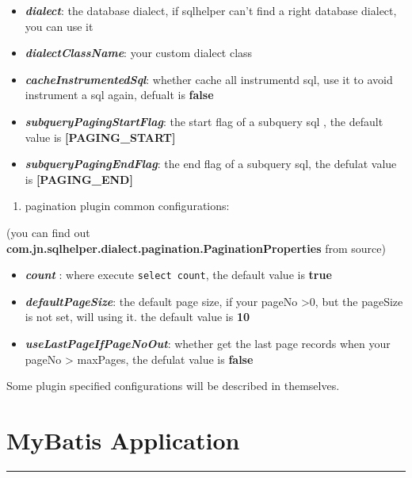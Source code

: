 \documentclass[
]{book}
\providecommand{\tightlist}{%
  \setlength{\itemsep}{0pt}\setlength{\parskip}{0pt}}
\begin{document}
\begin{itemize}
\tightlist
\item
  \textbf{\emph{dialect}}: the database dialect, if sqlhelper can't find a right database dialect, you can use it
\item
  \textbf{\emph{dialectClassName}}: your custom dialect class
\item
  \textbf{\emph{cacheInstrumentedSql}}: whether cache all instrumentd sql, use it to avoid instrument a sql again, defualt is \textbf{false}
\item
  \textbf{\emph{subqueryPagingStartFlag}}: the start flag of a subquery sql , the default value is \textbf{{[}PAGING\_START{]}}
\item
  \textbf{\emph{subqueryPagingEndFlag}}: the end flag of a subquery sql, the defulat value is \textbf{{[}PAGING\_END{]}}
\end{itemize}

\begin{enumerate}
\def\labelenumi{\arabic{enumi})}
\setcounter{enumi}{1}
\tightlist
\item
  pagination plugin common configurations:
\end{enumerate}

(you can find out \textbf{com.jn.sqlhelper.dialect.pagination.PaginationProperties} from source)

\begin{itemize}
\tightlist
\item
  \textbf{\emph{count}} : where execute \texttt{select\ count}, the default value is \textbf{true}
\item
  \textbf{\emph{defaultPageSize}}: the default page size, if your pageNo \textgreater0, but the pageSize is not set, will using it. the default value is \textbf{10}
\item
  \textbf{\emph{useLastPageIfPageNoOut}}: whether get the last page records when your pageNo \textgreater{} maxPages, the defulat value is \textbf{false}
\end{itemize}

Some plugin specified configurations will be described in themselves.

\hypertarget{sqlhelper_mybatis}{%
\section{MyBatis Application}\label{sqlhelper_mybatis}}

\begin{center}\rule{0.5\linewidth}{0.5pt}\end{center}
\end{document}
